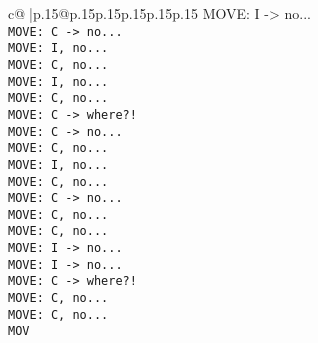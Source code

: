 \documentclass{article}
\begin{document}
{\begin{supertabular}{c@{$\;$}|p{.15\linewidth}@{}p{.15\linewidth}p{.15\linewidth}p{.15\linewidth}p{.15\linewidth}p{.15\linewidth}}
{{{MOVE: I -> no...\\ \tt  MOVE: C -> no...\\ \tt  MOVE: I, no...\\ \tt  MOVE: C, no...\\ \tt  MOVE: I, no...\\ \tt  MOVE: C, no...\\ \tt  MOVE: C -> where?!\\ \tt  MOVE: C -> no...\\ \tt  MOVE: C, no...\\ \tt  MOVE: I, no...\\ \tt  MOVE: C, no...\\ \tt  MOVE: C -> no...\\ \tt  MOVE: C, no...\\ \tt  MOVE: C, no...\\ \tt  MOVE: I -> no...\\ \tt  MOVE: I -> no...\\ \tt  MOVE: C -> where?!\\ \tt  MOVE: C, no...\\ \tt  MOVE: C, no...\\ \tt  MOV}}}
\end{supertabular}}
\end{document}
